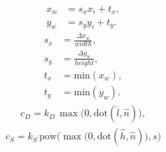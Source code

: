 \documentclass[12pt]{article}
\begin{document}
 
\begin{eqnarray} x_w &= s_x x_i + t_x,\\ y_w &= s_y y_i + t_y. \end{eqnarray}
\begin{eqnarray} s_x &= \frac{\Delta x_w}{width},\\ s_y &= \frac{\Delta y_w}{height},\\ t_x &= \text{min}(x_w),\\ t_y &= \text{min}(y_w). \end{eqnarray}
\begin{eqnarray} c_D = k_D \, \max \big( 0, \text{dot}(\hat{l}, \hat{n}) \big), \end{eqnarray} 
\begin{eqnarray} c_S = k_S \, \text{pow} \Big( \max \big( 0, \text{dot}(\hat{h}, \hat{n}) \big), s \Big) \end{eqnarray}
\end{document}
